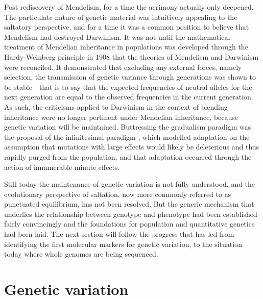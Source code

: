Post rediscovery of Mendelism, for a time the acrimony actually only deepened. The particulate nature of genetic material was intuitively appealing to the saltatory perspective, and for a time it was a common position to believe that Mendelism had destroyed Darwinism. It was not until the mathematical treatment of Mendelian inheritance in populations was developed through the Hardy-Weinberg principle in 1908 \citep{Hardy1908, Weinberg1908} that the theories of Mendelism and Darwinism were reconciled. It demonstrated that excluding any external forces, namely selection, the transmission of genetic variance through generations was shown to be stable - that is to say that the expected frequencies of neutral alleles for the next generation are equal to the observed frequencies in the current generation. As such, the criticisms applied to Darwinism in the context of blending inheritance were no longer pertinent under Mendelian inheritance, because genetic variation will be maintained. Buttressing the gradualism paradigm was the proposal of the infinitesimal paradigm \citep{Fisher1918}, which modelled adaptation on the assumption that mutations with large effects would likely be deleterious and thus rapidly purged from the population, and that adaptation occurred through the action of innumerable minute effects.

Still today the maintenance of genetic variation is not fully understood, and the evolutionary perspective of saltation, now more commonly referred to as punctuated equilibrium, has not been resolved. But the generic mechanism that underlies the relationship between genotype and phenotype had been established fairly convincingly and the foundations for population and quantitative genetics had been laid. The next section will follow the progress that has led from identifying the first molecular markers for genetic variation, to the situation today where whole genomes are being sequenced.


\section{Genetic variation}

